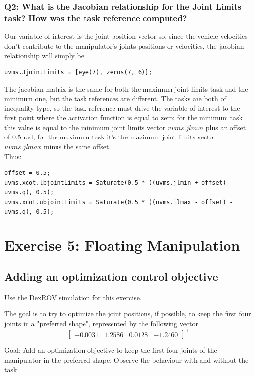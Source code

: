 \documentclass{article}
\begin{document}
\subsubsection{Q2: What is the Jacobian relationship for the Joint Limits task? How was the task reference computed?}
Our variable of interest is the joint position vector so, since the vehicle velocities don't contribute to the manipulator's joints positions or velocities, the jacobian relationship will simply be:
\begin{lstlisting}
uvms.JjointLimits = [eye(7), zeros(7, 6)];
\end{lstlisting}
The jacobian matrix is the same for both the maximum joint limits task and the minimum one, but the task references are different. The tasks are both of inequality type, so the task reference must drive the variable of interest to the first point where the activation function is equal to zero: for the minimum task this value is equal to the minimum joint limits vector $ uvms.jlmin $ plus an offset of 0.5 rad, for the maximum task it's the maximum joint limits vector $ uvms.jlmax $ minus the same offset. \\
Thus:
\begin{lstlisting}
offset = 0.5;
uvms.xdot.lbjointLimits = Saturate(0.5 * ((uvms.jlmin + offset) - uvms.q), 0.5);
uvms.xdot.ubjointLimits = Saturate(0.5 * ((uvms.jlmax - offset) - uvms.q), 0.5);
\end{lstlisting}

\clearpage



\section{Exercise 5: Floating Manipulation}
\subsection{Adding an optimization control objective}
Use the DexROV simulation for this exercise.

The goal is to try to optimize the joint positions, if possible, to keep the first four joints in a "preferred shape", represented by the following vector
\begin{displaymath}
\begin{bmatrix}-0.0031 & 1.2586 & 0.0128 & -1.2460 \end{bmatrix}^\top
\end{displaymath}

Goal: Add an optimization objective to keep the first four joints of the manipulator in the preferred shape. Observe the behaviour with and without the task
\end{document}
